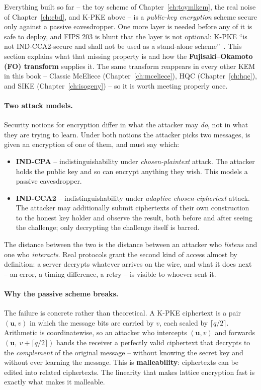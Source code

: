 Everything built so far -- the toy scheme of Chapter~\ref{ch:toymlkem}, the real
noise of Chapter~\ref{ch:cbd}, and K-PKE above -- is a \emph{public-key
encryption} scheme secure only against a passive eavesdropper. One more layer is
needed before any of it is safe to deploy, and FIPS 203 is blunt that the layer
is not optional: K-PKE ``is not IND-CCA2-secure and shall not be used as a
stand-alone scheme''~\cite{fips203}. This section explains what that missing
property is and how the \textbf{Fujisaki--Okamoto (FO) transform}
supplies it. The same transform reappears in every other KEM in this book --
Classic McEliece (Chapter~\ref{ch:mceliece}), HQC (Chapter~\ref{ch:hqc}), and
SIKE (Chapter~\ref{ch:isogeny}) -- so it is worth meeting properly once.

\paragraph{Two attack models.}
Security notions for encryption differ in what the attacker may \emph{do}, not
in what they are trying to learn. Under both notions the attacker picks two
messages, is given an encryption of one of them, and must say which:

\begin{itemize}
  \item \textbf{IND-CPA} -- indistinguishability under \emph{chosen-plaintext}
    attack. The attacker holds the public key and so can encrypt anything they
    wish. This models a passive eavesdropper.
  \item \textbf{IND-CCA2} -- indistinguishability under \emph{adaptive
    chosen-ciphertext} attack. The attacker may additionally submit ciphertexts
    of their own construction to the honest key holder and observe the result,
    both before and after seeing the challenge; only decrypting the challenge
    itself is barred.
\end{itemize}

The distance between the two is the distance between an attacker who
\emph{listens} and one who \emph{interacts}. Real protocols grant the second
kind of access almost by definition: a server decrypts whatever arrives on the
wire, and what it does next -- an error, a timing difference, a retry -- is
visible to whoever sent it.

\paragraph{Why the passive scheme breaks.}
The failure is concrete rather than theoretical. A K-PKE ciphertext is a pair
$(\mathbf{u}, v)$ in which the message bits are carried by $v$, each scaled by
$\lceil q/2 \rceil$. Arithmetic is coordinatewise, so an attacker who intercepts
$(\mathbf{u}, v)$ and forwards $(\mathbf{u},\ v + \lceil q/2 \rceil)$ hands the
receiver a perfectly valid ciphertext that decrypts to the \emph{complement} of
the original message -- without knowing the secret key and without ever learning
the message. This is \textbf{malleability}: ciphertexts can be edited into
related ciphertexts. The linearity that makes lattice encryption fast is exactly
what makes it malleable.

